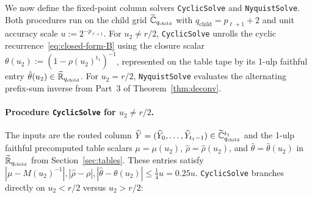We now define the fixed-point column solvers \texttt{CyclicSolve} and \texttt{NyquistSolve}. Both procedures run on the child grid $\widetilde{\mathbb{C}}_{q_{\mathrm{child}}}$ with $q_{\mathrm{child}} = p_{\ell+1} + 2$ and unit accuracy scale $u := 2^{-p_{\ell+1}}$. For $u_2 \ne r/2$, \texttt{CyclicSolve} unrolls the cyclic recurrence~\eqref{eq:closed-form-B} using the closure scalar $\theta(u_2) := (1 - \rho(u_2)^{t_1})^{-1}$, represented on the table tape by its 1-ulp faithful entry $\hat{\theta}(u_2) \in \widetilde{\mathbb{R}}_{q_{\mathrm{child}}}$. For $u_2 = r/2$, \texttt{NyquistSolve} evaluates the alternating prefix-sum inverse from Part~3 of Theorem~\ref{thm:deconv}.

\paragraph{Procedure \texttt{CyclicSolve} for $u_2 \ne r/2$.}
The inputs are the routed column $\widehat{Y} = (\widehat{Y}_0, \dots, \widehat{Y}_{t_1-1}) \in \widetilde{\mathbb{C}}_{q_{\mathrm{child}}}^{t_1}$ and the 1-ulp faithful precomputed table scalars $\mu = \mu(u_2)$, $\hat{\rho} = \hat{\rho}(u_2)$, and $\hat{\theta} = \hat{\theta}(u_2)$ in $\widetilde{\mathbb{R}}_{q_{\mathrm{child}}}$ from Section~\ref{sec:tables}. These entries satisfy $|\mu - M(u_2)^{-1}|, |\hat{\rho} - \rho|, |\hat{\theta} - \theta(u_2)| \le \frac{1}{4} u = 0.25 u$. \texttt{CyclicSolve} branches directly on $u_2 < r/2$ versus $u_2 > r/2$:

